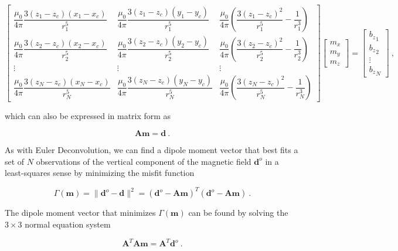 \begin{equation}
\label{CgjOtKLQKT}
\begin{bmatrix}
\dfrac{\mu_0}{4\pi}\dfrac{3(z_1 - z_c)(x_1 - x_c)}{r_1^5}
& \dfrac{\mu_0}{4\pi}\dfrac{3(z_1 - z_c)(y_1 - y_c)}{r_1^5}
& \dfrac{\mu_0}{4\pi}\left(\dfrac{3(z_1 - z_c)^2}{r_1^5} - \dfrac{1}{r_1^3}\right)
\\
\dfrac{\mu_0}{4\pi}\dfrac{3(z_2 - z_c)(x_2 - x_c)}{r_2^5}
& \dfrac{\mu_0}{4\pi}\dfrac{3(z_2 - z_c)(y_2 - y_c)}{r_2^5}
& \dfrac{\mu_0}{4\pi}\left(\dfrac{3(z_2 - z_c)^2}{r_2^5} - \dfrac{1}{r_2^3}\right)
\\
\vdots & \vdots & \vdots
\\
\dfrac{\mu_0}{4\pi}\dfrac{3(z_N - z_c)(x_N - x_c)}{r_N^5}
& \dfrac{\mu_0}{4\pi}\dfrac{3(z_N - z_c)(y_N - y_c)}{r_N^5}
& \dfrac{\mu_0}{4\pi}\left(\dfrac{3(z_N - z_c)^2}{r_N^5} - \dfrac{1}{r_N^3}\right)
\end{bmatrix}
\begin{bmatrix}
m_x \\ m_y \\ m_z
\end{bmatrix}
=
\begin{bmatrix}
{b_z}_1 \\ {b_z}_2 \\ \vdots \\ {b_z}_N
\end{bmatrix}
\ ,
\end{equation}

\noindent
which can also be expressed in matrix form as

\begin{equation}
\label{qdhqM4s9Ln}
\mathbf{A} \mathbf{m} = \mathbf{d} \ .
\end{equation}

As with Euler Deconvolution, we can find a dipole moment vector that best fits
a set of $N$ observations of the vertical component of the magnetic field
$\mathbf{d}^o$ in a least-squares sense by minimizing the misfit function

\begin{equation}
\label{uV9pRVYO4l}
\Gamma (\mathbf{m}) = \| \mathbf{d}^o - \mathbf{d} \|^2 = (\mathbf{d}^o - \mathbf{A}\mathbf{m})^T  (\mathbf{d}^o - \mathbf{A}\mathbf{m})\ .
\end{equation}

\noindent
The dipole moment vector that minimizes $\Gamma (\mathbf{m})$ can be found by
solving the $3 \times 3$ normal equation system

\begin{equation}
\mathbf{A}^T \mathbf{A} \mathbf{m} = \mathbf{A}^T\mathbf{d}^o\ .
\end{equation}

